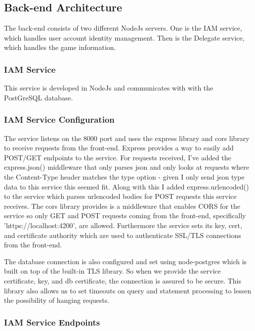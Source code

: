 \documentclass[12pt]{article}
\begin{document}
\subsection{Back-end Architecture}
The back-end consists of two different NodeJs servers. One is the IAM service, which handles user account identity management. Then is the Delegate service, which handles the game information.

\subsubsection{IAM Service}
This service is developed in NodeJs and communicates with with the PostGreSQL database.

\subsubsection{IAM Service Configuration}
The service listens on the 8000 port and uses the express library and cors library to receive requests from the front-end. Express provides a way to easily add POST/GET endpoints to the service. For requests received, I've added the express.json() middleware that only parses json and only looks at requests where the Content-Type header matches the type option - given I only send json type data to this service this seemed fit. Along with this I added express.urlencoded() to the service which parses urlencoded bodies for POST requests this service receives. The cors library provides is a middleware that enables CORS for the service so only GET and POST requests coming from the front-end, specifically 'https://localhost:4200', are allowed. Furthermore the service sets its key, cert, and certificate authority which are used to authenticate SSL/TLS connections from the front-end.

The database connection is also configured and set using node-postgres which is built on top of the built-in TLS library. So when we provide the service certificate, key, and db certificate, the connection is assured to be secure. This library also allows us to set timeouts on query and statement processing to lessen the possibility of hanging requests.


\subsubsection{IAM Service Endpoints}
\end{document}

